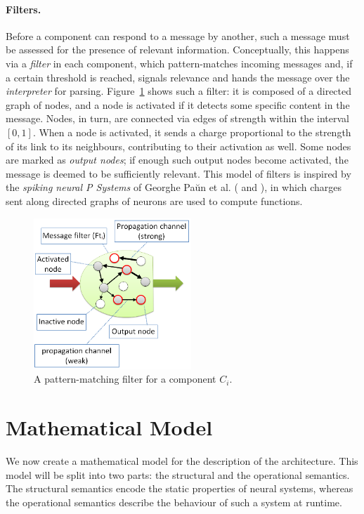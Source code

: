 \paragraph{Filters.} Before a component can respond to a message by another, such a message must be assessed for the presence of relevant information. Conceptually, this happens via a \emph{filter} in each component, which pattern-matches incoming messages and, if a certain threshold is reached, signals relevance and hands the message over the \emph{interpreter} for parsing. Figure~\ref{fig:filter} shows such a filter: it is composed of a directed graph of nodes, and a node is activated if it detects some specific content in the message. Nodes, in turn, are connected via edges of strength within the interval $[0,1]$. When a node is activated, it sends a charge proportional to the strength of its link to its neighbours, contributing to their activation as well. Some nodes are marked as {\em output nodes}; if enough such output nodes become activated, the message is deemed to be sufficiently relevant. This model of filters is inspired by the {\em spiking neural P Systems} of Georghe Pa\u{u}n et al. (\cite[p.\ 337]{membraneComputing} and \cite{spikingNeural}), in which charges sent along directed graphs of neurons are used to compute functions.

\begin{figure}[t]
	\centering
	\includegraphics[width=168pt]{Figs/filter.png}
	\caption{A pattern-matching filter for a component $C_i$.}
	\label{fig:filter}
\end{figure}

\section{Mathematical Model}\label{sec:mathematicalModel}

We now create a mathematical model for the description of the architecture. This model will be split into two parts: the structural and the operational semantics. The structural semantics encode the static properties of neural systems, whereas the operational semantics describe the behaviour of such a system at runtime.

